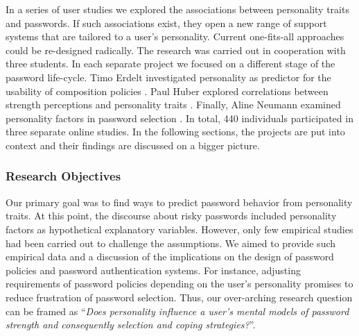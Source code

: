 In a series of user studies we explored the associations between personality traits and passwords. If such associations exist, they open a new range of support systems that are tailored to a user's personality. Current one-fits-all approaches could be re-designed radically. The research was carried out in cooperation with three students. In each separate project we focused on a different stage of the password life-cycle. Timo Erdelt investigated personality as predictor for the usability of composition policies \cite{Erdelt2017BA}. Paul Huber explored correlations between strength perceptions and personality traits \cite{Huber2016BA}. Finally, Aline Neumann examined personality factors in password selection \cite{Neumann2017BA}. In total, 440 individuals participated in three separate online studies. In the following sections, the projects are put into context and their findings are discussed on a bigger picture. 

\subsubsection*{Research Objectives}
Our primary goal was to find ways to predict password behavior from personality traits. At this point, the discourse about risky passwords included personality factors as hypothetical explanatory variables. However, only few empirical studies had been carried out to challenge the assumptions. We aimed to provide such empirical data and a discussion of the implications on the design of password policies and password authentication systems. For instance, adjusting requirements of password policies depending on the user's personality promises to reduce frustration of password selection. Thus, our over-arching research question can be framed as ``\textit{Does personality influence a user's mental models of password strength and consequently selection and coping strategies?}''.

%
%

